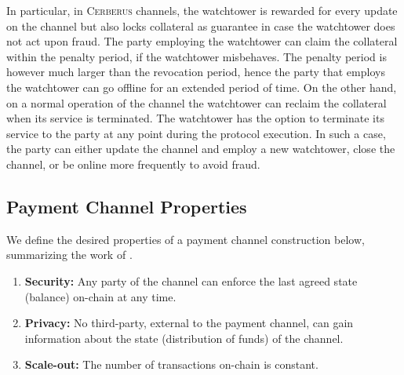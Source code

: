 \documentclass[runningheads]{llncs}
\newcommand{\sys}{\textsc{Cerberus}\xspace}
\begin{document}
In particular, in \sys channels, the watchtower is rewarded for every update on the channel but also locks collateral as guarantee in case the watchtower does not act upon fraud. The party employing the watchtower can claim the collateral within the penalty period, if the watchtower misbehaves. The penalty period is however much larger than the revocation period, hence the party that employs the watchtower can go offline for an extended period of time.
On the other hand, on a normal operation of the channel the watchtower can reclaim the collateral when its service is terminated. 
The watchtower has the option to terminate its service to the party at any point during the protocol execution. In such a case, the party can either update the channel and employ a new watchtower, close the channel, or be online more frequently to avoid fraud.


\subsection{Payment Channel Properties}\label{subsec:goals}
We define the desired properties of a payment channel construction below, summarizing the work of \cite{mccorry2018pisa,Miller2017sprites,avarikioti2019brick,gudgeon2019sok}. 

\begin{enumerate}
    \item \textbf{Security:} Any party of the channel can enforce the last agreed state (balance) on-chain at any time.
    \item \textbf{Privacy:} No third-party, external to the payment channel, can gain information about the state (distribution of funds) of the channel.
    \item \textbf{Scale-out:} The number of transactions on-chain is constant.
\end{enumerate}
\end{document}
